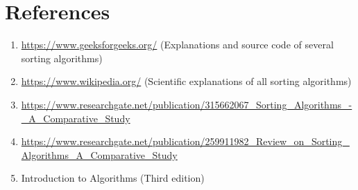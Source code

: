 \documentclass[11pt,a4paper]{article}
\begin{document}
\section{References}
\begin{enumerate}
  \item \url{https://www.geeksforgeeks.org/} (Explanations and source code of several sorting algorithms)\\
  \item \url{https://www.wikipedia.org/} (Scientific explanations of all sorting algorithms)\\
  \item \url{https://www.researchgate.net/publication/315662067_Sorting_Algorithms_-_A_Comparative_Study}\\
  \item \url{https://www.researchgate.net/publication/259911982_Review_on_Sorting_Algorithms_A_Comparative_Study}\\
  \item Introduction to Algorithms (Third edition)\\
\end{enumerate}
\end{document}
